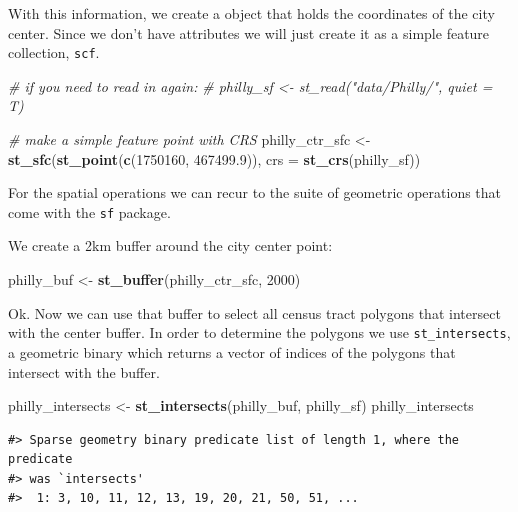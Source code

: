\documentclass[
]{book}
\newenvironment{Shaded}{\begin{snugshade}}{\end{snugshade}}
\newcommand{\AttributeTok}[1]{\textcolor[rgb]{0.13,0.29,0.53}{#1}}
\newcommand{\CommentTok}[1]{\textcolor[rgb]{0.56,0.35,0.01}{\textit{#1}}}
\newcommand{\DecValTok}[1]{\textcolor[rgb]{0.00,0.00,0.81}{#1}}
\newcommand{\FloatTok}[1]{\textcolor[rgb]{0.00,0.00,0.81}{#1}}
\newcommand{\FunctionTok}[1]{\textcolor[rgb]{0.13,0.29,0.53}{\textbf{#1}}}
\newcommand{\NormalTok}[1]{#1}
\newcommand{\OtherTok}[1]{\textcolor[rgb]{0.56,0.35,0.01}{#1}}
\begin{document}
With this information, we create a object that holds the coordinates of the city center. Since we don't have attributes we will just create it as a simple feature collection, \texttt{scf}.

\begin{Shaded}
\begin{Highlighting}[]
\CommentTok{\# if you need to read in again:}
\CommentTok{\# philly\_sf \textless{}{-} st\_read("data/Philly/", quiet = T)}

\CommentTok{\# make a simple feature point with CRS}
\NormalTok{philly\_ctr\_sfc }\OtherTok{\textless{}{-}} \FunctionTok{st\_sfc}\NormalTok{(}\FunctionTok{st\_point}\NormalTok{(}\FunctionTok{c}\NormalTok{(}\DecValTok{1750160}\NormalTok{, }\FloatTok{467499.9}\NormalTok{)), }\AttributeTok{crs =} \FunctionTok{st\_crs}\NormalTok{(philly\_sf))}
\end{Highlighting}
\end{Shaded}

For the spatial operations we can recur to the suite of geometric operations that come with the \texttt{sf} package.

We create a 2km buffer around the city center point:

\begin{Shaded}
\begin{Highlighting}[]
\NormalTok{philly\_buf }\OtherTok{\textless{}{-}} \FunctionTok{st\_buffer}\NormalTok{(philly\_ctr\_sfc, }\DecValTok{2000}\NormalTok{)}
\end{Highlighting}
\end{Shaded}

Ok. Now we can use that buffer to select all census tract polygons that intersect with the center buffer. In order to determine the polygons we use \texttt{st\_intersects}, a geometric binary which returns a vector of indices of the polygons that intersect with the buffer.

\begin{Shaded}
\begin{Highlighting}[]
\NormalTok{philly\_intersects }\OtherTok{\textless{}{-}} \FunctionTok{st\_intersects}\NormalTok{(philly\_buf, philly\_sf)}
\NormalTok{philly\_intersects}
\end{Highlighting}
\end{Shaded}

\begin{verbatim}
#> Sparse geometry binary predicate list of length 1, where the predicate
#> was `intersects'
#>  1: 3, 10, 11, 12, 13, 19, 20, 21, 50, 51, ...
\end{verbatim}
\end{document}
